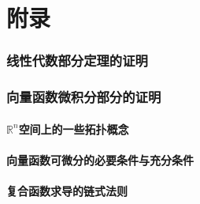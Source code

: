 \documentclass[zihao=-4,linespread=1.5,a4paper,heading=true,twoside]{ctexbook}
\theoremstyle{definition}
\theoremstyle{plain}
\begin{document}

\newpage\part{附录}
\section{线性代数部分定理的证明}\label{sec:VI.1}


\section{向量函数微积分部分的证明}\label{sec:VI.2}
\subsection{$\mathbb{R}^n$空间上的一些拓扑概念}


\subsection{向量函数可微分的必要条件与充分条件}


\subsection{复合函数求导的链式法则}

\end{document}
